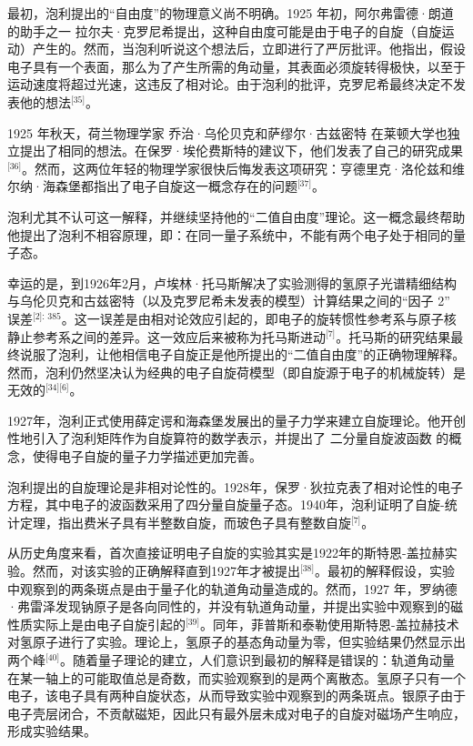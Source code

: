 最初，泡利提出的“自由度”的物理意义尚不明确。1925 年初，阿尔弗雷德·朗道的助手之一 拉尔夫·克罗尼希提出，这种自由度可能是由于电子的自旋（自旋运动）产生的。然而，当泡利听说这个想法后，立即进行了严厉批评。他指出，假设电子具有一个表面，那么为了产生所需的角动量，其表面必须旋转得极快，以至于运动速度将超过光速，这违反了相对论。由于泡利的批评，克罗尼希最终决定不发表他的想法\(^\text{[35]}\)。

1925 年秋天，荷兰物理学家 乔治·乌伦贝克和萨缪尔·古兹密特 在莱顿大学也独立提出了相同的想法。在保罗·埃伦费斯特的建议下，他们发表了自己的研究成果\(^\text{[36]}\)。然而，这两位年轻的物理学家很快后悔发表这项研究：亨德里克·洛伦兹和维尔纳·海森堡都指出了电子自旋这一概念存在的问题\(^\text{[37]}\)。  

泡利尤其不认可这一解释，并继续坚持他的“二值自由度”理论。这一概念最终帮助他提出了泡利不相容原理，即：在同一量子系统中，不能有两个电子处于相同的量子态。

幸运的是，到1926年2月，卢埃林·托马斯解决了实验测得的氢原子光谱精细结构与乌伦贝克和古兹密特（以及克罗尼希未发表的模型）计算结果之间的“因子 2” 误差\(^\text{[2]: 385}\)。这一误差是由相对论效应引起的，即电子的旋转惯性参考系与原子核静止参考系之间的差异。这一效应后来被称为托马斯进动\(^\text{[7]}\)。托马斯的研究结果最终说服了泡利，让他相信电子自旋正是他所提出的“二值自由度”的正确物理解释。然而，泡利仍然坚决认为经典的电子自旋荷模型（即自旋源于电子的机械旋转）是无效的\(^\text{[34][6]}\)。  

1927年，泡利正式使用薛定谔和海森堡发展出的量子力学来建立自旋理论。他开创性地引入了泡利矩阵作为自旋算符的数学表示，并提出了 二分量自旋波函数 的概念，使得电子自旋的量子力学描述更加完善。

泡利提出的自旋理论是非相对论性的。1928年，保罗·狄拉克表了相对论性的电子方程，其中电子的波函数采用了四分量自旋量子态。1940年，泡利证明了自旋-统计定理，指出费米子具有半整数自旋，而玻色子具有整数自旋\(^\text{[7]}\)。  

从历史角度来看，首次直接证明电子自旋的实验其实是1922年的斯特恩-盖拉赫实验。然而，对该实验的正确解释直到1927年才被提出\(^\text{[38]}\)。最初的解释假设，实验中观察到的两条斑点是由于量子化的轨道角动量造成的。然而，1927 年，罗纳德·弗雷泽发现钠原子是各向同性的，并没有轨道角动量，并提出实验中观察到的磁性质实际上是由电子自旋引起的\(^\text{[39]}\)。同年，菲普斯和泰勒使用斯特恩-盖拉赫技术对氢原子进行了实验。理论上，氢原子的基态角动量为零，但实验结果仍然显示出两个峰\(^\text{[40]}\)。随着量子理论的建立，人们意识到最初的解释是错误的：轨道角动量在某一轴上的可能取值总是奇数，而实验观察到的是两个离散态。氢原子只有一个电子，该电子具有两种自旋状态，从而导致实验中观察到的两条斑点。银原子由于电子壳层闭合，不贡献磁矩，因此只有最外层未成对电子的自旋对磁场产生响应，形成实验结果。

